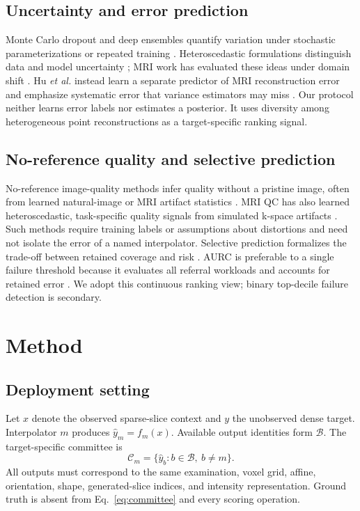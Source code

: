 \documentclass{article}
\begin{document}
\subsection{Uncertainty and error prediction}
Monte Carlo dropout and deep ensembles quantify variation under stochastic parameterizations or repeated training \cite{gal2016dropout,lakshminarayanan2017deepensembles}. Heteroscedastic formulations distinguish data and model uncertainty \cite{kendall2017uncertainties}; MRI work has evaluated these ideas under domain shift \cite{kuestner2024ensembles}. Hu \emph{et al.} instead learn a separate predictor of MRI reconstruction error and emphasize systematic error that variance estimators may miss \cite{hu2021predict}. Our protocol neither learns error labels nor estimates a posterior. It uses diversity among heterogeneous point reconstructions as a target-specific ranking signal.

\subsection{No-reference quality and selective prediction}
No-reference image-quality methods infer quality without a pristine image, often from learned natural-image or MRI artifact statistics \cite{stepien2022nriqa}. MRI QC has also learned heteroscedastic, task-specific quality signals from simulated k-space artifacts \cite{shaw2020heteroscedastic}. Such methods require training labels or assumptions about distortions and need not isolate the error of a named interpolator. Selective prediction formalizes the trade-off between retained coverage and risk \cite{elyaniv2010selective,geifman2019selectivenet}. AURC is preferable to a single failure threshold because it evaluates all referral workloads and accounts for retained error \cite{ding2020aurc}. We adopt this continuous ranking view; binary top-decile failure detection is secondary.

\section{Method}

\subsection{Deployment setting}
Let $x$ denote the observed sparse-slice context and $y$ the unobserved dense target. Interpolator $m$ produces $\hat y_m=f_m(x)$. Available output identities form $\mathcal B$. The target-specific committee is
\begin{equation}
 \mathcal C_m=\{\hat y_b:b\in\mathcal B,\ b\neq m\}.
 \label{eq:committee}
\end{equation}
All outputs must correspond to the same examination, voxel grid, affine, orientation, shape, generated-slice indices, and intensity representation. Ground truth is absent from Eq.~\eqref{eq:committee} and every scoring operation.
\end{document}

